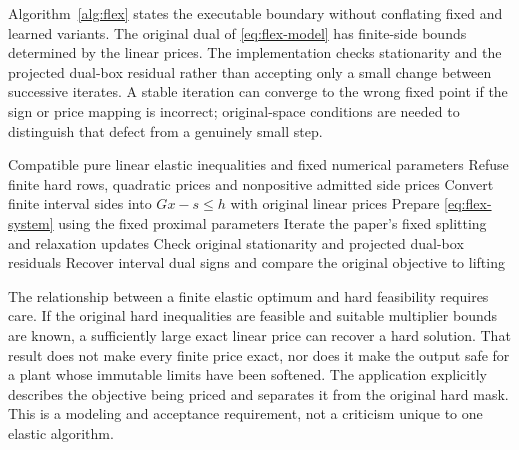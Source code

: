 Algorithm~\ref{alg:flex} states the executable boundary without conflating
fixed and learned variants. The original dual of \eqref{eq:flex-model} has
finite-side bounds determined by the linear prices. The implementation checks
stationarity and the projected dual-box residual rather than accepting only a
small change between successive iterates. A stable iteration can converge to
the wrong fixed point if the sign or price mapping is incorrect; original-space
conditions are needed to distinguish that defect from a genuinely small step.

\begin{algorithm}[htbp]
\caption{Execute the fixed FlexQP equations on an admitted pure linear elastic problem, preserving original prices and independently testing the returned original-space optimum.}\label{alg:flex}
\begin{algorithmic}[1]
\Require Compatible pure linear elastic inequalities and fixed numerical parameters
\State Refuse finite hard rows, quadratic prices and nonpositive admitted side prices
\State Convert finite interval sides into $Gx-s\leq h$ with original linear prices
\State Prepare \eqref{eq:flex-system} using the fixed proximal parameters
\State Iterate the paper's fixed splitting and relaxation updates
\State Check original stationarity and projected dual-box residuals
\State Recover interval dual signs and compare the original objective to lifting
\end{algorithmic}
\end{algorithm}

The relationship between a finite elastic optimum and hard feasibility requires
care. If the original hard inequalities are feasible and suitable multiplier
bounds are known, a sufficiently large exact linear price can recover a hard
solution. That result does not make every finite price exact, nor does it make
the output safe for a plant whose immutable limits have been softened. The
application explicitly describes the objective being priced and separates it
from the original hard mask. This is a modeling and acceptance requirement,
not a criticism unique to one elastic algorithm.

